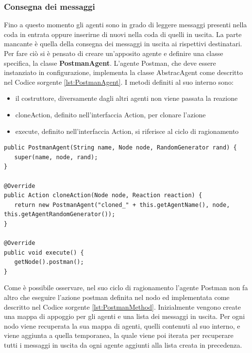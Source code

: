 \documentclass[12pt,a4paper,openright,twoside]{report}
\begin{document}
\subsubsection{Consegna dei messaggi}\label{ConsegnaMessaggi}
Fino a questo momento gli agenti sono in grado di leggere messaggi presenti nella coda in entrata oppure inserirne di nuovi nella coda di quelli in uscita. La parte mancante \`e quella della consegna dei messaggi in uscita ai rispettivi destinatari. Per fare ci\`o si \`e pensato di creare un'apposito agente e definire una classe specifica, la classe \textbf{PostmanAgent}. L'agente Postman, che deve essere instanziato in configurazione, implementa la classe AbstracAgent come descritto nel Codice sorgente \ref{lst:PostmanAgent}. I metodi definiti al suo interno sono:
\begin{itemize}
   \item il costruttore, diversamente dagli altri agenti non viene passata la reazione
   \item cloneAction, definito nell'interfaccia Action, per clonare l'azione
   \item execute, definito nell'interfaccia Action, si riferisce al ciclo di ragionamento
\end{itemize}
\medskip
\begin{lstlisting}[label={lst:PostmanAgent},caption={Agente Postman}]
public PostmanAgent(String name, Node node, RandomGenerator rand) {
   super(name, node, rand);
}

@Override
public Action cloneAction(Node node, Reaction reaction) {
   return new PostmanAgent("cloned_" + this.getAgentName(), node, this.getAgentRandomGenerator());
}

@Override
public void execute() {
   getNode().postman();
}
\end{lstlisting}
Come \`e possibile osservare, nel suo ciclo di ragionamento l'agente Postman non fa altro che eseguire l'azione postman definita nel nodo ed implementata come descritto nel Codice sorgente \ref{lst:PostmanMethod}.
Inizialmente vengono create una mappa di appoggio per gli agenti e una lista dei messaggi in uscita.
Per ogni nodo viene recuperata la sua mappa di agenti, quelli contenuti al suo interno, e viene aggiunta a quella temporanea, la quale viene poi iterata per recuperare tutti i messaggi in uscita da ogni agente aggiunti alla lista creata in precedenza.
\end{document}
